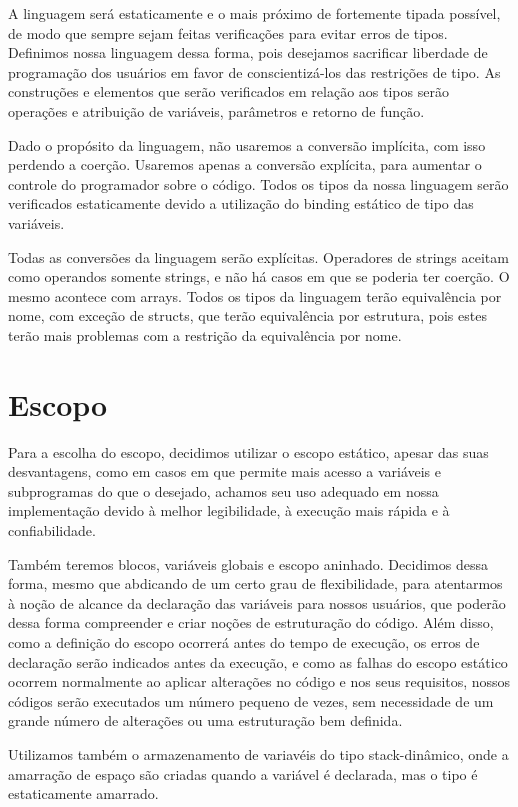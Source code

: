 A linguagem será estaticamente e o mais próximo de fortemente tipada possível,
de modo que sempre sejam feitas verificações para evitar erros de tipos.
Definimos nossa linguagem dessa forma, pois desejamos sacrificar liberdade de
programação dos usuários em favor de conscientizá-los das restrições de tipo.
As construções e elementos que serão verificados em relação aos tipos serão
operações e atribuição de variáveis, parâmetros e retorno de função.

Dado o propósito da linguagem, não usaremos a conversão implícita, com isso
perdendo a coerção. Usaremos apenas a conversão explícita, para aumentar o
controle do programador sobre o código. Todos os tipos da nossa linguagem serão
verificados estaticamente devido a utilização do binding estático de tipo das
variáveis.

Todas as conversões da linguagem serão explícitas. Operadores de strings
aceitam como operandos somente strings, e não há casos em que se poderia ter
coerção. O mesmo acontece com arrays. Todos os tipos da linguagem terão
equivalência por nome, com exceção de structs, que terão equivalência por
estrutura, pois estes terão mais problemas com a restrição da equivalência por
nome.

\section{Escopo}
Para a escolha do escopo, decidimos utilizar o escopo estático, apesar das
suas desvantagens, como em casos em que permite mais acesso a variáveis e
subprogramas do que o desejado, achamos seu uso adequado em nossa implementação
devido à melhor legibilidade, à execução mais rápida e à confiabilidade.

Também teremos blocos, variáveis globais e escopo aninhado. Decidimos dessa
forma, mesmo que abdicando de um certo grau de flexibilidade, para atentarmos à
noção de alcance da declaração das variáveis para nossos usuários, que poderão
dessa forma compreender e criar noções de estruturação do código. Além disso,
como a definição do escopo ocorrerá antes do tempo de execução, os erros de
declaração serão indicados antes da execução, e como as falhas do escopo
estático ocorrem normalmente ao aplicar alterações no código e nos seus
requisitos, nossos códigos serão executados um número pequeno de vezes, sem
necessidade de um grande número de alterações ou uma estruturação bem definida.

Utilizamos também o armazenamento de variavéis do tipo stack-dinâmico, onde a
amarração de espaço são criadas quando a variável é declarada, mas o tipo é
estaticamente amarrado.

